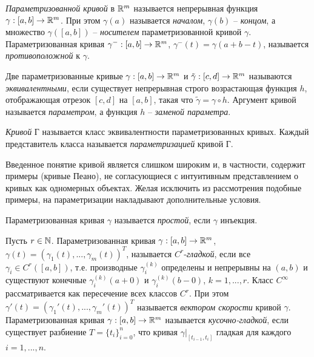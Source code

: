 \begin{definition}
    \textit{Параметризованной кривой} в $\mathbb{R}^m$ называется непрерывная функция $\gamma: [a, b] \to \mathbb{R}^m$. При этом $\gamma(a)$ называется \textit{началом}, $\gamma(b)$ -- \textit{концом}, а множество $\gamma([a, b])$ -- \textit{носителем} параметризованной кривой $\gamma$.\\
    Параметризованная кривая $\gamma^{-}: [a, b] \to \mathbb{R}^m$, $\gamma^{-}(t) = \gamma(a + b - t)$, называется \textit{противоположной} к $\gamma$.
\end{definition}

\begin{definition}
    Две параметризованные кривые $\gamma: [a, b] \to \mathbb{R}^m$ и $\tilde\gamma: [c, d] \to \mathbb{R}^m$ называются \textit{эквивалентными}, если существует непрерывная строго возрастающая функция $h$, отображающая отрезок $[c, d]$ на $[a, b]$, такая что $\tilde\gamma = \gamma \circ h$. Аргумент кривой называется \textit{параметром}, а функция $h$ -- \textit{заменой параметра}.
\end{definition}

\begin{definition}
    \textit{Кривой} Г называется класс эквивалентности параметризованных кривых. Каждый представитель класса называется \textit{параметризацией} кривой Г.
\end{definition}

Введенное понятие кривой является слишком широким и, в частности, содержит примеры (кривые Пеано), не согласующиеся с интуитивным представлением о кривых как одномерных объектах. Желая исключить из рассмотрения подобные примеры, на параметризации накладывают дополнительные условия.

\begin{definition}
    Параметризованная кривая $\gamma$ называется \textit{простой}, если $\gamma$ инъекция.
\end{definition}

\begin{definition}
    Пусть $r \in \mathbb{N}$. Параметризованная кривая $\gamma: [a, b] \to \mathbb{R}^m$, $\gamma(t) = (\gamma_{1}(t), ... , \gamma_{m}(t))^{T}$, называется $C^{r}$-\textit{гладкой}, если все $\gamma_{i} \in C^{r}([a, b])$, т.е. производные $\gamma_{i}^{(k)}$ определены и непрерывны на $(a, b)$ и существуют конечные $\gamma_{i}^{(k)}(a + 0)$ и $\gamma_{i}^{(k)}(b - 0)$, $k = 1, ... , r$. Класс $C^{\infty}$ рассматривается как пересечение всех классов $C^{r}$. При этом $\gamma'(t) = (\gamma_{1}'(t), ... , \gamma_{m}'(t))^{T}$ называется \textit{вектором скорости} кривой $\gamma$. Параметризованная кривая $\gamma: [a, b] \to \mathbb{R}^m$ называется \textit{кусочно-гладкой}, если существует разбиение $T = \{t_{i}\}_{i = 0}^{n}$, что кривая $\gamma|_{[t_{i-1}, t_{i}]}$ гладкая для каждого $i = 1, ... , n$.
\end{definition}

